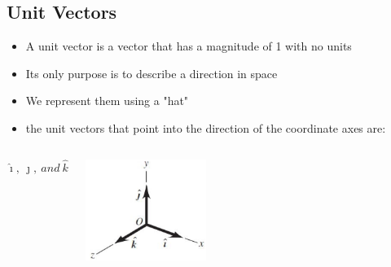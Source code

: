 \documentclass[]{beamer}
\begin{document}
\subsection{Unit Vectors}


\begin{frame}

\begin{itemize}
\item A unit vector is a vector that has a magnitude of 1  with no units
\pause
\item  Its only purpose is  to describe a direction in space
\pause
\item We represent them using a "hat"
\pause
\item the unit vectors that point into the direction of the coordinate axes are:
\pause




\end{itemize}



   \begin{columns}[c]
   \column{2in}  %

\begin{equation*}
\hat{\imath},~\hat{\jmath},~and~\hat{k}
\end{equation*}

  
   \column{2in}




  \begin{center}
  \includegraphics[height=1.3in]{images/unit_vec_1.jpg}
\end{center}


   \end{columns}





 \end{frame}
\end{document}
